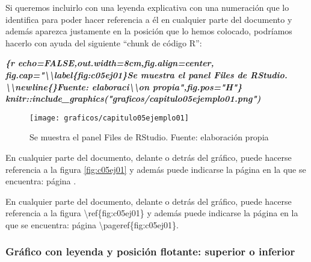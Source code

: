 \documentclass[12pt,a4paper,]{book}
\newenvironment{Shaded}{\begin{snugshade}}{\end{snugshade}}
\newcommand{\InformationTok}[1]{\textcolor[rgb]{0.56,0.35,0.01}{\textbf{\textit{#1}}}}
\newcommand{\NormalTok}[1]{#1}
\numberwithin{dummy}{section}
\theoremstyle{ocrenumbox}
\theoremstyle{blacknumex}
\theoremstyle{blacknumbox}
\theoremstyle{ocrenum}
\theoremstyle{ocrenum}
\begin{document}
Si queremos incluirlo con una leyenda explicativa con una numeración que
lo identifica para poder hacer referencia a él en cualquier parte del
documento y además aparezca justamente en la posición que lo hemos
colocado, podríamos hacerlo con ayuda del siguiente ``chunk de código
R'':

\begin{Shaded}
\begin{Highlighting}[]
\InformationTok{\textasciigrave{}\textasciigrave{}\textasciigrave{}\{r echo=FALSE,out.width=\textquotesingle{}8cm\textquotesingle{},fig.align=\textquotesingle{}center\textquotesingle{},}
\InformationTok{fig.cap="\textbackslash{}\textbackslash{}label\{fig:c05ej01\}Se muestra el panel Files de RStudio. }
\InformationTok{\textbackslash{}\textbackslash{}newline\{\}Fuente: elaboraci\textbackslash{}\textbackslash{}\textquotesingle{}on propia",fig.pos="H"\}}
\InformationTok{knitr::include\_graphics("graficos/capitulo05ejemplo01.png")}
\InformationTok{\textasciigrave{}\textasciigrave{}\textasciigrave{}}
\end{Highlighting}
\end{Shaded}

\begin{figure}[H]
 
 {\centering \texttt{[image: graficos/capitulo05ejemplo01]} 
 
 }
 
 \caption{\label{fig:c05ej01}Se muestra el panel Files de RStudio. \newline{}Fuente: elaboraci\'on propia}\label{fig:unnamed-chunk-22}
 \end{figure}

En cualquier parte del documento, delante o detrás del gráfico, puede
hacerse referencia a la figura \ref{fig:c05ej01} y además puede
indicarse la página en la que se encuentra: página
\pageref{fig:c05ej01}.

\begin{Shaded}
\begin{Highlighting}[]
\NormalTok{En cualquier parte del documento, delante o detrás del gráfico, puede }
\NormalTok{hacerse referencia a la figura \textbackslash{}ref\{fig:c05ej01\} y además puede indicarse }
\NormalTok{la página en la que se encuentra: página \textbackslash{}pageref\{fig:c05ej01\}.}
\end{Highlighting}
\end{Shaded}

\hypertarget{gruxe1fico-con-leyenda-y-posiciuxf3n-flotante-superior-o-inferior}{%
\subsubsection{Gráfico con leyenda y posición flotante: superior o
inferior}\label{gruxe1fico-con-leyenda-y-posiciuxf3n-flotante-superior-o-inferior}}
\end{document}
